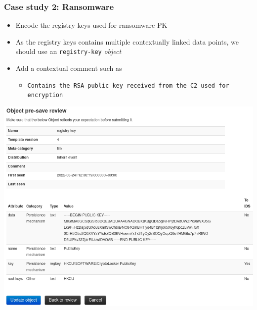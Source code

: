 \begin{frame}
    \frametitle{Case study 2: Ransomware}
    \begin{itemize}
        \item Encode the registry keys used for ransomware PK
        \item As the registry keys contains multiple contextually linked data points, we should use an \texttt{registry-key} \textit{object}
        \item Add a contextual comment such as
        \begin{itemize}
            \item \texttt{Contains the RSA public key received from the C2 used for encryption}
        \end{itemize}
    \end{itemize}
    \begin{center}
        \includegraphics[width=0.55\linewidth]{pictures/case2/object-registry-pb.png}
    \end{center}
\end{frame}


